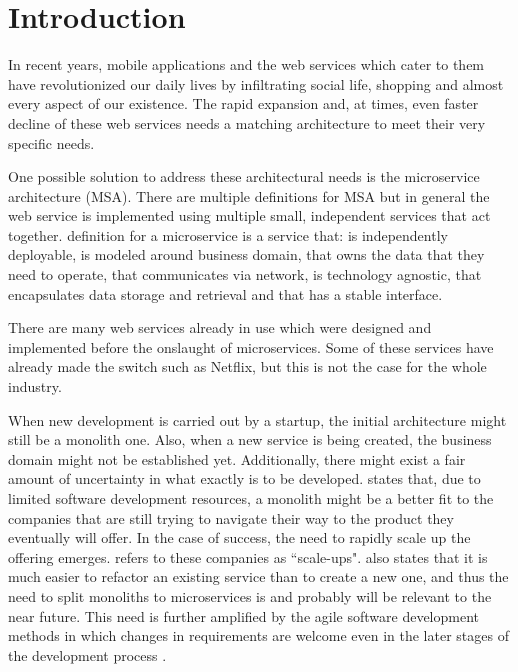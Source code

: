 


\section{Introduction}
\begin{sloppypar}
    In recent years, mobile applications and the web services which cater to
    them have revolutionized our daily lives by infiltrating social life,
    shopping and almost every aspect of our existence. The rapid expansion and,
    at times, even faster decline of these web services needs a matching
    architecture to meet their very specific needs.
\end{sloppypar}
\begin{sloppypar} One possible solution to address these architectural needs
     is the microservice architecture (MSA). There are multiple definitions for
     MSA but in general the web service is implemented using multiple small,
     independent services that act together.
     \citet{newman2019} definition for a microservice is a service that: is
     independently deployable, is modeled around business domain, that owns the
     data that they need to operate, that communicates via network, is
     technology agnostic, that encapsulates data storage and retrieval and that
     has a stable interface.
\end{sloppypar}
\begin{sloppypar}
    There are many web services already in use which were designed and
    implemented before the onslaught of microservices. Some of these services
    have already made the switch such as Netflix, but this is not the case for
    the whole industry.
\end{sloppypar}
\begin{sloppypar}
    When new development is carried out by a startup, the initial architecture
    might still be a monolith one. Also, when a new service is being created,
    the business domain might not be established yet. Additionally, there might
    exist a fair amount of uncertainty in what exactly is to be developed.
    \citet{newman2019} states that, due to limited software development
    resources, a monolith might be a better fit to the companies that are still
    trying to navigate their way to the product they eventually will offer. In
    the case of success, the need to rapidly scale up the offering emerges.
    \citet{newman2019} refers to these companies as ``scale-ups".
    \citet{newman2019} also states that it is much easier to refactor an
    existing service than to create a new one, and thus the need to split
    monoliths to microservices is and probably will be relevant to the near
    future. This need is further amplified by the agile software development
    methods in which changes in requirements are welcome even in the later
    stages of the development process \citep{agilemanifesto}.
\end{sloppypar}

